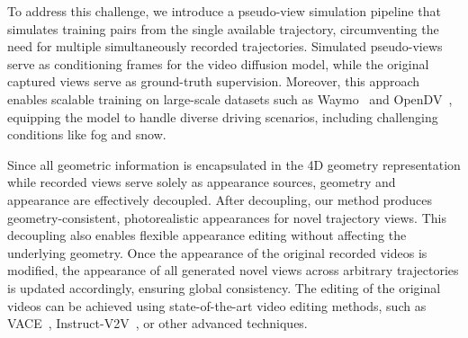To address this challenge, we introduce a pseudo-view simulation pipeline that simulates training pairs from the single available trajectory, circumventing the need for multiple simultaneously recorded trajectories. Simulated pseudo-views serve as conditioning frames for the video diffusion model, while the original captured views serve as ground-truth supervision. Moreover, this approach enables scalable training on large-scale datasets such as Waymo~\cite{Sun_2020_CVPR} and OpenDV~\cite{gao2024vista}, equipping the model to handle diverse driving scenarios, including challenging conditions like fog and snow.



Since all geometric information is encapsulated in the 4D geometry representation while recorded views serve solely as appearance sources, geometry and appearance are effectively decoupled.
After decoupling, our method produces geometry-consistent, photorealistic appearances for novel trajectory views. This decoupling also enables flexible appearance editing without affecting the underlying geometry. Once the appearance of the original recorded videos is modified, the appearance of all generated novel views across arbitrary trajectories is updated accordingly, ensuring global consistency. The editing of the original videos can be achieved using state-of-the-art video editing methods, such as VACE~\cite{vace}, Instruct-V2V~\cite{cheng2023consistent}, or other advanced techniques.




